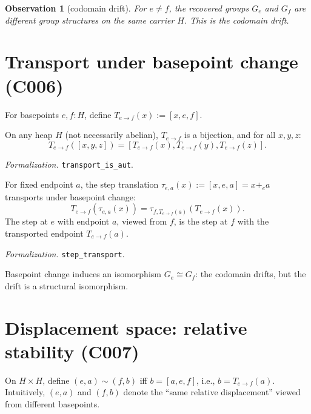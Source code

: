 \documentclass[sigplan,10pt,anonymous,review]{acmart}
\newtheorem{observation}{Observation}
\theoremstyle{remark}
\begin{document}
\begin{observation}[codomain drift]\label{obs:drift}
For $e \neq f$, the recovered groups $G_e$ and $G_f$ are \textit{different} group
structures on the same carrier $H$. This is the \textit{codomain drift}.
\end{observation}

\section{Transport under basepoint change (C006)}

\begin{definition}\label{def:transport}
For basepoints $e, f : H$, define $T_{e \to f}(x) := [x, e, f]$.
\end{definition}

\begin{theorem}[$T$ is an automorphism, C006]\label{thm:aut}
On any heap $H$ (not necessarily abelian), $T_{e \to f}$ is a bijection, and for all
$x, y, z$:
\[
T_{e \to f}([x, y, z]) = [T_{e \to f}(x), T_{e \to f}(y), T_{e \to f}(z)].
\]
\end{theorem}
\emph{Formalization.} \texttt{transport\_is\_aut}.

\begin{theorem}\label{thm:transport}
For fixed endpoint $a$, the step translation $\tau_{e,a}(x) := [x, e, a] = x +_e a$
transports under basepoint change:
\[
T_{e \to f}(\tau_{e,a}(x)) = \tau_{f, T_{e \to f}(a)}(T_{e \to f}(x)).
\]
The step at $e$ with endpoint $a$, viewed from $f$, is the step at $f$ with the
transported endpoint $T_{e \to f}(a)$.
\end{theorem}
\emph{Formalization.} \texttt{step\_transport}.

\begin{corollary}\label{cor:isom}
Basepoint change induces an isomorphism $G_e \cong G_f$: the codomain drifts, but the
drift is a structural isomorphism.
\end{corollary}

\section{Displacement space: relative stability (C007)}

\begin{definition}\label{def:displ}
On $H \times H$, define $(e, a) \sim (f, b)$ iff $b = [a, e, f]$, i.e.,
$b = T_{e \to f}(a)$. Intuitively, $(e,a)$ and $(f,b)$ denote the ``same relative
displacement'' viewed from different basepoints.
\end{definition}
\end{document}
